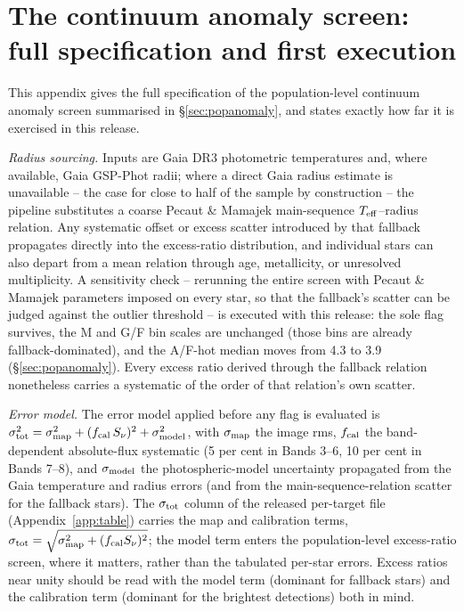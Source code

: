 \documentclass{openjournal}
\begin{document}
\section{The continuum anomaly screen: full specification and first execution}
\label{app:continuum}

This appendix gives the full specification of the population-level
continuum anomaly screen summarised in \S\ref{sec:popanomaly}, and
states exactly how far it is exercised in this release.

\emph{Radius sourcing.} Inputs are Gaia DR3 photometric temperatures
and, where available, Gaia GSP-Phot radii; where a direct Gaia radius
estimate is unavailable -- the case for close to half of the sample by
construction -- the pipeline substitutes a coarse Pecaut \& Mamajek
main-sequence $T_{\rm eff}$--radius relation. Any systematic offset or
excess scatter introduced by that fallback propagates directly into the
excess-ratio distribution, and individual stars can also depart from a
mean relation through age, metallicity, or unresolved multiplicity.
A sensitivity check -- rerunning the entire screen with Pecaut \&
Mamajek parameters imposed on every star, so that the fallback's
scatter can be judged against the outlier threshold -- is executed
with this release: the sole flag survives, the M and G/F bin scales
are unchanged (those bins are already fallback-dominated), and the
A/F-hot median moves from 4.3 to 3.9 (\S\ref{sec:popanomaly}). Every
excess ratio derived through the fallback relation nonetheless carries
a systematic of the order of that relation's own scatter.

\emph{Error model.} The error model applied before any flag is
evaluated is
$\sigma_{\rm tot}^{2} = \sigma_{\rm map}^{2} +
(f_{\rm cal}\,S_\nu)^{2} + \sigma_{\rm model}^{2}$, with
$\sigma_{\rm map}$ the image rms, $f_{\rm cal}$ the band-dependent
absolute-flux systematic (5 per cent in Bands 3--6, 10 per cent in
Bands 7--8), and $\sigma_{\rm model}$ the photospheric-model
uncertainty propagated from the Gaia temperature and radius errors
(and from the main-sequence-relation scatter for the fallback stars).
The $\sigma_{\rm tot}$ column of the released per-target file (Appendix~\ref{app:table}) carries the map
and calibration terms,
$\sigma_{\rm tot} = \sqrt{\sigma_{\rm map}^{2} + (f_{\rm cal} S_\nu)^{2}}$;
the model term enters the population-level excess-ratio screen, where
it matters, rather than the tabulated per-star errors. Excess ratios
near unity should be read with the model term (dominant for fallback
stars) and the calibration term (dominant for the brightest detections)
both in mind.
\end{document}
